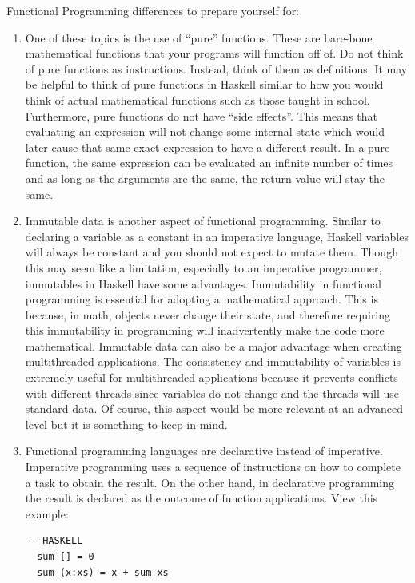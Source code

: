\documentclass{article}
\begin{document}
\medskip\noindent
Functional Programming differences to prepare yourself for:
\begin{enumerate}
  \item One of these topics is the use of “pure” functions. These are bare-bone mathematical functions that your programs will function off of. Do not think of pure functions as instructions. Instead, think of them as definitions. It may be helpful to think of pure functions in Haskell similar to how you would think of actual mathematical functions such as those taught in school. Furthermore, pure functions do not have “side effects”. This means that evaluating an expression will not change some internal state which would later cause that same exact expression to have a different result. In a pure function, the same expression can be evaluated an infinite number of times and as long as the arguments are the same, the return value will stay the same.
  
  \item Immutable data is another aspect of functional programming. Similar to declaring a variable as a constant in an imperative language, Haskell variables will always be constant and you should not expect to mutate them. Though this may seem like a limitation, especially to an imperative programmer, immutables in Haskell have some advantages. Immutability in functional programming is essential for adopting a mathematical approach. This is because, in math, objects never change their state, and therefore requiring this immutability in programming will inadvertently make the code more mathematical. Immutable data can also be a major advantage when creating multithreaded applications. The consistency and immutability of variables is extremely useful for multithreaded applications because it prevents conflicts with different threads since variables do not change and the threads will use standard data. Of course, this aspect would be more relevant at an advanced level but it is something to keep in mind.
  
  \item Functional programming languages are declarative instead of imperative. Imperative programming uses a sequence of instructions on how to complete a task to obtain the result. On the other hand, in declarative programming the result is declared as the outcome of function applications. View this example:

  \begin{lstlisting}[style=HaskellStyle]
  -- HASKELL
  sum [] = 0
  sum (x:xs) = x + sum xs
  \end{lstlisting}


\end{enumerate}
\end{document}
